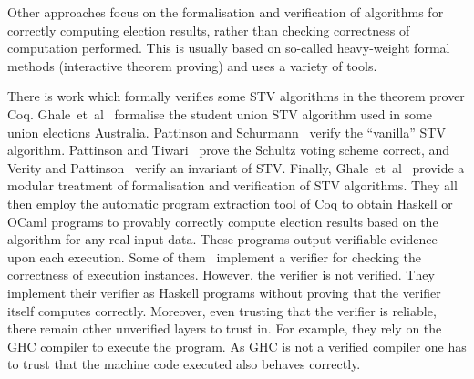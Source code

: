 \documentclass[10pt,conference]{IEEEtran}
\begin{document}
Other approaches focus on the  formalisation and verification of algorithms for correctly computing election results, rather than checking correctness of computation performed. This is usually based on so-called heavy-weight formal methods (interactive theorem proving) and uses a variety of 
 tools. 


There is work which formally verifies some STV algorithms in the theorem prover Coq. Ghale~et~al~\cite{Ghale:2017:FVS} formalise the student union STV algorithm used in some union elections Australia. Pattinson and Schurmann~\cite{DBLP:conf/ausai/PattinsonS15} verify the ``vanilla'' STV algorithm.   Pattinson and Tiwari~\cite{DBLP:conf/itp/PattinsonT17} prove the Schultz voting scheme correct, and Verity and Pattinson~\cite{DBLP:conf/acsw/VerityP17} verify an invariant of STV. Finally, Ghale~et~al~\cite{Ghale2018} provide a modular treatment of formalisation and verification of STV algorithms. They all then employ the automatic program extraction tool of Coq to obtain Haskell or OCaml programs to provably correctly compute election results based on the algorithm for any real input data. These programs output verifiable evidence upon each execution. Some of them~\cite{DBLP:conf/ausai/PattinsonS15,DBLP:conf/itp/PattinsonT17}    
 implement a verifier for checking the correctness of execution instances. However, the verifier is not verified. They implement their verifier as Haskell programs without proving that the verifier itself computes correctly. Moreover, even trusting that the verifier is reliable, there remain other unverified layers to trust in. For example, they rely on the GHC compiler to execute the program. As GHC is not a verified compiler one has to trust that the machine code executed also behaves correctly. 
  
\end{document}
